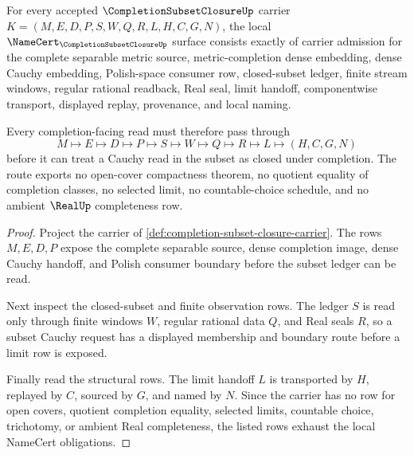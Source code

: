\begin{theorem}
\label{thm:completion-subset-closure-namecert-obligations}
For every accepted $\CompletionSubsetClosureUp$ carrier $K=(M,E,D,P,S,W,Q,R,L,H,C,G,N)$, the local $\NameCert_{\CompletionSubsetClosureUp}$ surface consists exactly of carrier admission for the complete separable metric source, metric-completion dense embedding, dense Cauchy embedding, Polish-space consumer row, closed-subset ledger, finite stream windows, regular rational readback, Real seal, limit handoff, componentwise transport, displayed replay, provenance, and local naming.

Every completion-facing read must therefore pass through
$$
M\longmapsto E\longmapsto D\longmapsto P\longmapsto S\longmapsto W\longmapsto Q\longmapsto R\longmapsto L\longmapsto(H,C,G,N)
$$
before it can treat a Cauchy read in the subset as closed under completion. The route exports no open-cover compactness theorem, no quotient equality of completion classes, no selected limit, no countable-choice schedule, and no ambient $\RealUp$ completeness row.
\end{theorem}
\begin{proof}
Project the carrier of \autoref{def:completion-subset-closure-carrier}. The rows $M,E,D,P$ expose the complete separable source, dense completion image, dense Cauchy handoff, and Polish consumer boundary before the subset ledger can be read.

Next inspect the closed-subset and finite observation rows. The ledger $S$ is read only through finite windows $W$, regular rational data $Q$, and Real seals $R$, so a subset Cauchy request has a displayed membership and boundary route before a limit row is exposed.

Finally read the structural rows. The limit handoff $L$ is transported by $H$, replayed by $C$, sourced by $G$, and named by $N$. Since the carrier has no row for open covers, quotient completion equality, selected limits, countable choice, trichotomy, or ambient Real completeness, the listed rows exhaust the local NameCert obligations.
\end{proof}

